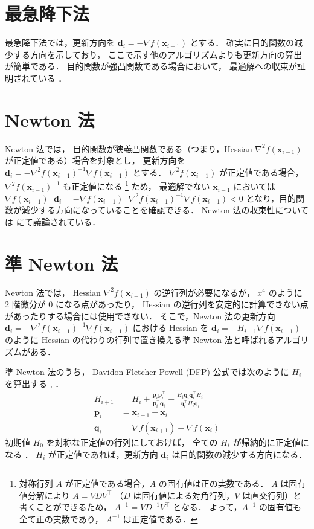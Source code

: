 \section{最急降下法}

最急降下法では，更新方向を $\bm{d}_i = -\nabla f(\bm{x}_{i-1})$ とする．
確実に目的関数の減少する方向を示しており，
ここで示す他のアルゴリズムよりも更新方向の算出が簡単である．
目的関数が強凸関数である場合において，
最適解への収束が証明されている
\cite[Section 9.3.1]{Boyd2004}．

\section{Newton 法}

Newton 法では，
目的関数が狭義凸関数である（つまり，Hessian $\nabla^2 f(\bm{x}_{i-1})$ が正定値である）場合を対象とし，
更新方向を
$\bm{d}_i = -\nabla^2 f(\bm{x}_{i-1})^{-1} \nabla f(\bm{x}_{i-1})$
とする．
$\nabla^2 f(\bm{x}_{i-1})$ が正定値である場合，
$\nabla^2 f(\bm{x}_{i-1})^{-1}$ も正定値になる
\footnote{%
対称行列 $A$ が正定値である場合，$A$ の固有値は正の実数である．%
$A$ は固有値分解により $A=VDV^\top$ （$D$ は固有値による対角行列，$V$ は直交行列）と書くことができるため，%
$A^{-1} = VD^{-1}V^\top$ となる．%
よって，$A^{-1}$ の固有値も全て正の実数であり，%
$A^{-1}$ は正定値である．%
}
ため，
最適解でない $\bm{x}_{i-1}$ においては
$\nabla f(\bm{x}_{i-1})^\top \bm{d}_i = -\nabla f(\bm{x}_{i-1})^\top \nabla^2 f(\bm{x}_{i-1})^{-1} \nabla f(\bm{x}_{i-1}) < 0$
となり，目的関数が減少する方向になっていることを確認できる．
Newton 法の収束性については \cite[Section 9.5.3, 9.6.4]{Boyd2004} にて議論されている．

\section{準 Newton 法}

Newton 法では，
Hessian $\nabla^2 f(\bm{x}_{i-1})$ の逆行列が必要になるが，
$x^4$ のように 2 階微分が 0 になる点があったり，
Hessian の逆行列を安定的に計算できない点があったりする場合には使用できない．
そこで，Newton 法の更新方向
$\bm{d}_i = -\nabla^2 f(\bm{x}_{i-1})^{-1} \nabla f(\bm{x}_{i-1})$
における Hessian を
$\bm{d}_i = -H_{i-1} \nabla f(\bm{x}_{i-1})$
のように Hessian の代わりの行列で置き換える準 Newton 法と呼ばれるアルゴリズムがある．

準 Newton 法のうち，
Davidon-Fletcher-Powell (DFP) 公式では次のように $H_i$ を算出する
\cite[Section 9.3]{Luenberger2003}, \cite[Section 10.9]{Press2007}．
\begin{align}
    H_{i+1} &= H_i + \frac{\bm{p}_i \bm{p}_i^\top}{\bm{p}_i^\top \bm{q}_i}
        - \frac{H_i \bm{q}_i \bm{q}_i^\top H_i}{\bm{q}_i^\top H_i \bm{q}_i} \\
    \bm{p}_i &= \bm{x}_{i+1} - \bm{x}_i \\
    \bm{q}_i &= \nabla f(\bm{x}_{i+1}) - \nabla f(\bm{x}_i)
\end{align}
初期値 $H_0$ を対称な正定値の行列にしておけば，
全ての $H_i$ が帰納的に正定値になる
\cite[Section 9.3]{Luenberger2003}．
$H_i$ が正定値であれば，更新方向 $\bm{d}_i$ は目的関数の減少する方向になる．

